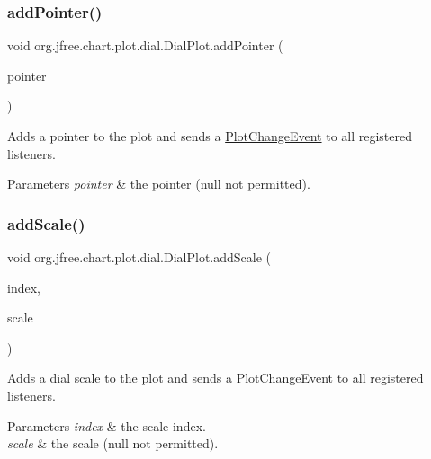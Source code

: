 \subsubsection{\texorpdfstring{add\+Pointer()}{addPointer()}}
{\footnotesize\ttfamily void org.\+jfree.\+chart.\+plot.\+dial.\+Dial\+Plot.\+add\+Pointer (\begin{DoxyParamCaption}\item[{\mbox{\hyperlink{classorg_1_1jfree_1_1chart_1_1plot_1_1dial_1_1_dial_pointer}{Dial\+Pointer}}}]{pointer }\end{DoxyParamCaption})}

Adds a pointer to the plot and sends a \mbox{\hyperlink{}{Plot\+Change\+Event}} to all registered listeners.


\begin{DoxyParams}{Parameters}
{\em pointer} & the pointer ({\ttfamily null} not permitted). \\
\hline
\end{DoxyParams}
\mbox{\label{classorg_1_1jfree_1_1chart_1_1plot_1_1dial_1_1_dial_plot_adf9e838616e2fecb14f3662d0382557c}} 
\subsubsection{\texorpdfstring{add\+Scale()}{addScale()}}
{\footnotesize\ttfamily void org.\+jfree.\+chart.\+plot.\+dial.\+Dial\+Plot.\+add\+Scale (\begin{DoxyParamCaption}\item[{int}]{index,  }\item[{\mbox{\hyperlink{interfaceorg_1_1jfree_1_1chart_1_1plot_1_1dial_1_1_dial_scale}{Dial\+Scale}}}]{scale }\end{DoxyParamCaption})}

Adds a dial scale to the plot and sends a \mbox{\hyperlink{}{Plot\+Change\+Event}} to all registered listeners.


\begin{DoxyParams}{Parameters}
{\em index} & the scale index. \\
\hline
{\em scale} & the scale ({\ttfamily null} not permitted). \\
\hline
\end{DoxyParams}
\mbox{\label{classorg_1_1jfree_1_1chart_1_1plot_1_1dial_1_1_dial_plot_aaa3708c0186d65525c74e859c5232e39}} 
